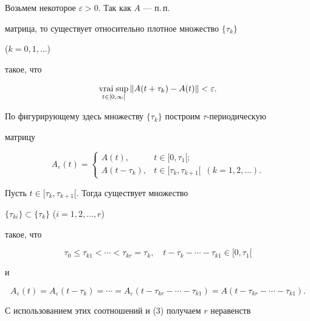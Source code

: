 


\begin{pf} 


Возьмем некоторое $\varepsilon>0$. Так как $A$ --- п.\,п. 


матрица, то существует относительно плотное множество $\{\tau_k\}$ 


($k=0,1,\dotsc$) 


такое, что 


\begin{equation} 


\vraisup_{t\in[0,\infty[}\|A(t+\tau_k)-A(t)\|<\varepsilon. 


\end{equation} 


По фигурирующему здесь множеству $\{\tau_k\}$ построим $\tau$-периодическую 


матрицу 


$$ 


A_\varepsilon(t)= 


\begin{cases} 


A(t), & t\in[0,\tau_1[;\\ 


A(t-\tau_k), & t\in[\tau_k,\tau_{k+1}[\ \; (k=1,2,\dotsc). 


\end{cases} 


$$ 


 


Пусть $t\in[\tau_k,\tau_{k+1}[$. Тогда существует множество 


$\{\tau_{ki}\}\subset\{\tau_k\}$ ($i=1,2,\dotsc,r$) 


такое, что 


$$ 


\tau_0\le\tau_{k1}<\dotsb<\tau_{kr}=\tau_k,\quad 


t-\tau_k-\dotsb-\tau_{k1}\in[0,\tau_1[ 


$$ 


и 


$$ 


A_\varepsilon(t)=A_\varepsilon(t-\tau_k)=\dotsb= 


A_\varepsilon(t-\tau_{kr}-\dotsb-\tau_{k1})= 


A(t-\tau_{kr}-\dotsb-\tau_{k1}). 


$$ 


С использованием этих соотношений и (3) получаем $r$ неравенств 


\begin{align*} 



\end{align*}
\end{pf}
